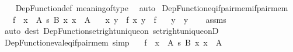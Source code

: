 \begin{isabellebody}
%
\isadelimproof
\ \ %
\endisadelimproof
%
\isatagproof
{}\isamarkupfalse%
\ Dep{\isacharunderscore}{\kern0pt}Function{\isacharunderscore}{\kern0pt}def\ meaning{\isacharunderscore}{\kern0pt}of{\isacharunderscore}{\kern0pt}type\ \isamarkupfalse%
\ auto%
\endisatagproof
{\isafoldproof}%
%
\isadelimproof
\isanewline
%
\endisadelimproof
\isanewline
{}\isamarkupfalse%
\ Dep{\isacharunderscore}{\kern0pt}Function{\isacharunderscore}{\kern0pt}eq{\isacharunderscore}{\kern0pt}if{\isacharunderscore}{\kern0pt}pair{\isacharunderscore}{\kern0pt}mem{\isacharunderscore}{\kern0pt}if{\isacharunderscore}{\kern0pt}pair{\isacharunderscore}{\kern0pt}mem{\isacharcolon}{\kern0pt}\isanewline
\ \ \ {\isachardoublequoteopen}f\ {\isacharcolon}{\kern0pt}\ {\isacharparenleft}{\kern0pt}x\ {\isacharcolon}{\kern0pt}\ A{\isacharparenright}{\kern0pt}\ {\isasymrightarrow}s\ B\ x{\isachardoublequoteclose}\ {\isachardoublequoteopen}x\ {\isacharcolon}{\kern0pt}\ A{\isachardoublequoteclose}\isanewline
\ \ \ {\isachardoublequoteopen}{\isasymlangle}x{\isacharcomma}{\kern0pt}\ y{\isasymrangle}\ {\isasymin}\ f{\isachardoublequoteclose}\ {\isachardoublequoteopen}{\isasymlangle}x{\isacharcomma}{\kern0pt}\ y{\isacharprime}{\kern0pt}{\isasymrangle}\ {\isasymin}\ f{\isachardoublequoteclose}\isanewline
\ \ \ {\isachardoublequoteopen}y\ {\isacharequal}{\kern0pt}\ y{\isacharprime}{\kern0pt}{\isachardoublequoteclose}\isanewline
%
\isadelimproof
\ \ %
\endisadelimproof
%
\isatagproof
{}\isamarkupfalse%
\ assms\ \isamarkupfalse%
\ {\isacharparenleft}{\kern0pt}auto\ dest{\isacharcolon}{\kern0pt}\ Dep{\isacharunderscore}{\kern0pt}Function{\isacharunderscore}{\kern0pt}set{\isacharunderscore}{\kern0pt}right{\isacharunderscore}{\kern0pt}unique{\isacharunderscore}{\kern0pt}on\ set{\isacharunderscore}{\kern0pt}right{\isacharunderscore}{\kern0pt}unique{\isacharunderscore}{\kern0pt}onD{\isacharparenright}{\kern0pt}%
\endisatagproof
{\isafoldproof}%
%
\isadelimproof
\isanewline
%
\endisadelimproof
\isanewline
{}\isamarkupfalse%
\ Dep{\isacharunderscore}{\kern0pt}Function{\isacharunderscore}{\kern0pt}eval{\isacharunderscore}{\kern0pt}eq{\isacharunderscore}{\kern0pt}if{\isacharunderscore}{\kern0pt}pair{\isacharunderscore}{\kern0pt}mem\ {\isacharbrackleft}{\kern0pt}simp{\isacharbrackright}{\kern0pt}{\isacharcolon}{\kern0pt}\isanewline
\ \ \ {\isachardoublequoteopen}f\ {\isacharcolon}{\kern0pt}\ {\isacharparenleft}{\kern0pt}x\ {\isacharcolon}{\kern0pt}\ A{\isacharparenright}{\kern0pt}\ {\isasymrightarrow}s\ B\ x{\isachardoublequoteclose}\ {\isachardoublequoteopen}x\ {\isacharcolon}{\kern0pt}\ A{\isachardoublequoteclose}\isanewline

\end{isabellebody}

